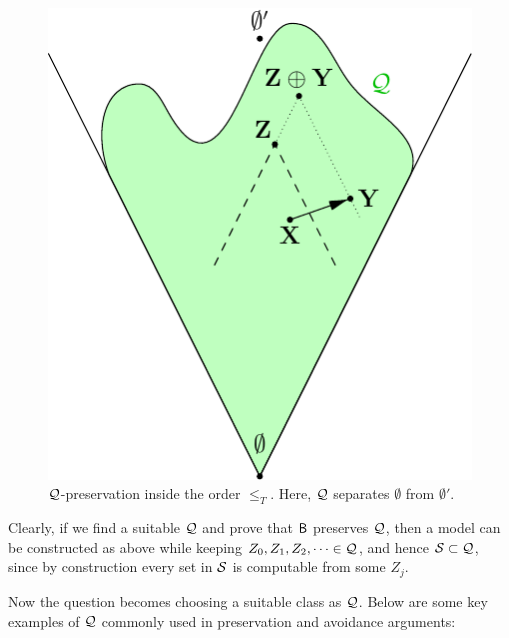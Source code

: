 \documentclass{amsart}
\begin{document}
	\begin{figure}[h]
		\includegraphics{Figures/Preservation.pdf}
		\caption{$\mathcal{Q}$-preservation inside the order $\leq_T$. Here, $\mathcal{Q}$ separates $\emptyset$ from $\emptyset'$.}
	\end{figure}
	
	Clearly, if we find a suitable $\mathcal{Q}$ and prove that $\sf{B}$ preserves $\mathcal{Q}$, then a model can be constructed as above while keeping $Z_0,Z_1,Z_2,\dots \in \mathcal{Q}$, and hence $\mathcal{S}\subset \mathcal{Q}$, since by construction every set in $\mathcal{S}$ is computable from some $Z_j$. 
	
	Now the question becomes choosing a suitable class as $\mathcal{Q}$. Below are some key examples of $\mathcal{Q}$ commonly used in preservation and avoidance arguments:
	
\end{document}
